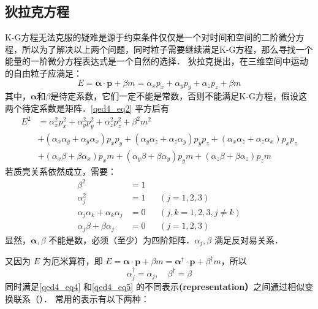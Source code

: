 \subsection{狄拉克方程}
K-G方程无法克服的疑难是源于约束条件仅仅是一个对时间和空间的二阶微分方程，所以为了解决以上两个问题，同时粒子需要继续满足K-G方程，那么寻找一个能量的一阶微分方程表达式是一个自然的选择．
狄拉克提出，在三维空间中运动的自由粒子应满足：
\begin{equation}\label{qed4_eq2}
E=\boldsymbol{\alpha} \cdot \boldsymbol{p}+\beta m=\alpha_{x} p_{x}+\alpha_{y} p_{y}+\alpha_{z} p_{z}+\beta m
\end{equation}
其中，$\boldsymbol {\alpha}$和$\beta$是待定系数，它们一定不能是常数，否则不能满足K-G方程，假设这两个待定系数是矩阵．\autoref{qed4_eq2} 平方后有
\begin{equation}\label{qed4_eq3}
\begin{aligned}
E^{2} &=\alpha_{x}^{2} p_{x}^{2}+\alpha_{y}^{2} p_{y}^{2}+\alpha_{z}^{2} p_{z}^{2}+\beta^{2} m^{2} \\
&+\left(\alpha_{x} \alpha_{y}+\alpha_{y} \alpha_{x}\right) p_{x} p_{y}+\left(\alpha_{y} \alpha_{z}+\alpha_{z} \alpha_{y}\right) p_{y} p_{z}+\left(\alpha_{x} \alpha_{z}+\alpha_{z} \alpha_{x}\right) p_{x} p_{z} \\
&+\left(\alpha_{x} \beta+\beta \alpha_{x}\right) p_{x} m+\left(\alpha_{y} \beta+\beta \alpha_{y}\right) p_{y} m+\left(\alpha_{z} \beta+\beta \alpha_{z}\right) p_{z} m
\end{aligned}
\end{equation}
若质壳关系依然成立，需要：
\begin{equation}\label{qed4_eq4}
\begin{aligned}
\beta^{2} &=1 & & \\
\alpha_j^{2} &=1 & &(j=1,2,3) \\
\alpha_j \alpha_k+\alpha_k \alpha_j &=0 & &(j, k=1,2,3, j \neq k) \\
\alpha_j \beta+\beta \alpha_j &=0 & &(j=1,2,3)
\end{aligned}
\end{equation}
显然，$\boldsymbol{\alpha}, \beta$ 不能是数，必须（至少）为四阶矩阵．$\alpha_j, \beta$ 满足反对易关系．

又因为 $E$ 为厄米算符，即 $E=\boldsymbol{\alpha} \cdot \boldsymbol{p}+\beta m=\boldsymbol{\alpha}^\dagger \cdot \boldsymbol{p}+\beta^\dagger m$，所以
\begin{equation}\label{qed4_eq5}
\alpha_j^{\dagger}=\alpha_j, \quad \beta^{\dagger}=\beta
\end{equation}
同时满足\autoref{qed4_eq4} 和\autoref{qed4_eq5} 的不同表示\textbf{(representation）}之间通过相似变换联系（）．
常用的表示有以下两种：

